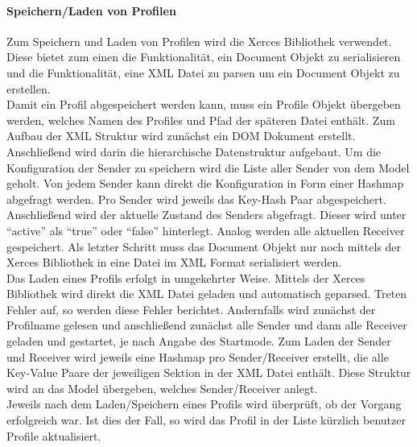 \paragraph{Speichern/Laden von Profilen}
Zum Speichern und Laden von Profilen wird die Xerces Bibliothek verwendet. Diese bietet zum einen die Funktionalität, ein Document Objekt zu serialisieren und die Funktionalität, eine XML Datei zu parsen um ein Document Objekt zu erstellen.\\
Damit ein Profil abgespeichert werden kann, muss ein Profile Objekt übergeben werden, welches Namen des Profiles und Pfad der späteren Datei enthält. Zum Aufbau der XML Struktur wird zunächst ein DOM Dokument erstellt. Anschließend wird darin die hierarchische Datenstruktur aufgebaut.
Um die Konfiguration der Sender zu speichern wird die Liste aller Sender von dem Model geholt. Von jedem Sender kann direkt die Konfiguration in Form einer Hashmap abgefragt werden. Pro Sender wird jeweils das Key-Hash Paar abgespeichert. Anschließend wird der aktuelle Zustand des Senders abgefragt.
Dieser wird unter "`active"' als "`true"' oder "`false"' hinterlegt. Analog werden alle aktuellen Receiver gespeichert. Als letzter Schritt muss das Document Objekt nur noch mittels der Xerces Bibliothek in eine Datei im XML Format serialisiert werden.\\\newline
Das Laden eines Profils erfolgt in umgekehrter Weise. Mittels der Xerces Bibliothek wird direkt die XML Datei geladen und automatisch geparsed. Treten Fehler auf, so werden diese Fehler berichtet. Andernfalls wird zunächst der Profilname gelesen und anschließend zunächst alle Sender und dann alle Receiver geladen und gestartet, je nach Angabe des Startmode.
Zum Laden der Sender und Receiver wird jeweils eine Hashmap pro Sender/Receiver erstellt, die alle Key-Value Paare der jeweiligen Sektion in der XML Datei enthält. Diese Struktur wird an das Model übergeben, welches Sender/Receiver anlegt.\\
Jeweils nach dem Laden/Speichern eines Profils wird überprüft, ob der Vorgang erfolgreich war. Ist dies der Fall, so wird das Profil in der Liste kürzlich benutzer Profile aktualisiert.
